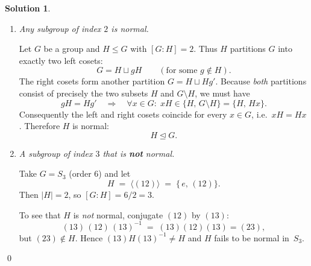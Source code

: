 \documentclass[12pt]{article}
\theoremstyle{definition} %
\newtheorem{solution}{Solution}
\theoremstyle{plain} %
\begin{document}
      \begin{solution}
        \begin{enumerate}[label=\textbf{(\alph*)}]
        
        \item  \emph{Any subgroup of index $2$ is normal.}
        
        Let $G$ be a group and $H\le G$ with $[G:H]=2$.  
        Thus $H$ partitions $G$ into exactly two left cosets:
        \[
           G = H \sqcup gH
           \qquad(\text{for some } g\notin H).
        \]
        The right cosets form another partition
        \(
           G = H \sqcup Hg'.
        \)
        Because \emph{both} partitions consist of precisely the two subsets
        $H$ and $G\!\setminus\!H$, we must have
        \[
                gH = Hg'
                \quad\Longrightarrow\quad
                \forall x\in G:\;xH \in \{H,\,G\!\setminus\!H\}
                = \{H,\,Hx\}.
        \]
        Consequently the left and right cosets coincide for every $x\in G$,
        i.e.\ $xH = Hx$.  
        Therefore $H$ is normal:
        \[
           H \trianglelefteq G.
        \]
        
        \medskip
        
        \item  \emph{A subgroup of index $3$ that is \textbf{not} normal.}
        
        Take $G=S_{3}$ (order $6$) and let
        \[
           H \;=\; \langle (12)\rangle
                \;=\; \bigl\{\,e,\,(12)\bigr\}.
        \]
        Then $|H|=2$, so $[G:H]=6/2 = 3$.
        
        To see that $H$ is \emph{not} normal, conjugate $(12)$ by $(13)$:
        \[
           (13)\,(12)\,(13)^{-1} \;=\; (13)(12)(13) = (23),
        \]
        but $(23)\notin H$.  
        Hence $(13)H(13)^{-1}\neq H$ and $H$ fails to be normal in~$S_{3}$.
        
        \end{enumerate}\qed
        \end{solution}
\end{document}
